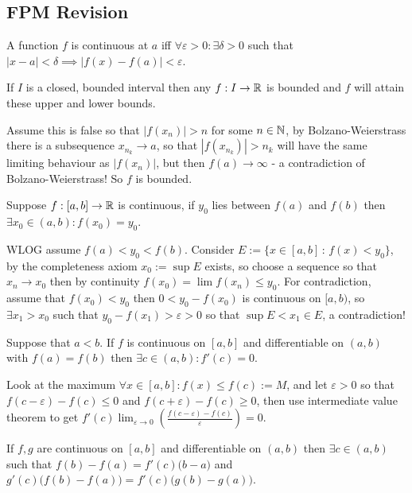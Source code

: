 \vspace{-1ex}\dotfill\vspace{-1ex}
\begin{multicols}{2}
\subsection*{FPM Revision\vspace{-1ex}}
\begin{definition}
A function $f$ is continuous at $a$ iff $\forall\varepsilon>0:\exists\delta>0$ such that $|x-a|<\delta\implies|f(x)-f(a)|<\varepsilon$. 
\end{definition}

\begin{theorem}
If $I$ is a closed, bounded interval then any $f:I\to\mathbb{R}$ is bounded and $f$ will attain these upper and lower bounds.
\end{theorem}
\begin{proof1}
Assume this is false so that $|f(x_n)|>n$ for some $n\in\mathbb{N}$, by Bolzano-Weierstrass there is a subsequence $x_{n_k}\to a$, so that $|f(x_{n_k})|>n_k$ will have the same limiting behaviour as $|f(x_n)|$, but then $f(a)\to\infty$ - a contradiction of Bolzano-Weierstrass! So $f$ is bounded.
\end{proof1}

\begin{theorem}
Suppose $f:[a,b]\to\mathbb{R}$ is continuous, if $y_0$ lies between $f(a)$ and $f(b)$ then $\exists x_0\in(a,b): f(x_0)=y_0$.
\end{theorem}
\begin{proof1}
WLOG assume $f(a)<y_0<f(b)$. Consider $E:=\{x\in[a,b]\,:\,f(x)<y_0\}$, by the completeness axiom $x_0:=\sup E$ exists, so choose a sequence so that $x_n\to x_0$ then by continuity $f(x_0) = \lim f(x_n) \leq y_0$. For contradiction, assume that $f(x_0)<y_0$ then $0<y_0-f(x_0)$ is continuous on $[a,b)$, so $\exists x_1>x_0$ such that $y_0-f(x_1)>\varepsilon>0$ so that $\sup E<x_1\in E$, a contradiction!
\end{proof1}

\begin{theorem}[Rolle]
Suppose that $a<b$. If $f$ is continuous on $[a,b]$ and differentiable on $(a,b)$ with $f(a)=f(b)$ then $\exists c\in(a,b): f'(c)=0$.
\end{theorem}
\begin{proof1}
Look at the maximum $\forall x\in[a,b]: f(x)\leq f(c):= M$, and let $\varepsilon>0$ so that $f(c-\varepsilon)-f(c)\leq 0$ and $f(c+\varepsilon)-f(c)\geq0$, then use intermediate value theorem to get $f'(c) \lim_{\varepsilon\to0}\left(\frac{f(c-\varepsilon)-f(c)}{\varepsilon}\right) = 0$.
\end{proof1}

\begin{theorem}
If $f,g$ are continuous on $[a,b]$ and differentiable on $(a,b)$ then $\exists c\in(a,b)$ such that $f(b)-f(a) = f'(c)\big(b-a\big)$ and $g'(c)\big(f(b)-f(a)\big)=f'(c)\big(g(b)-g(a)\big)$.
\end{theorem}
\end{multicols}

